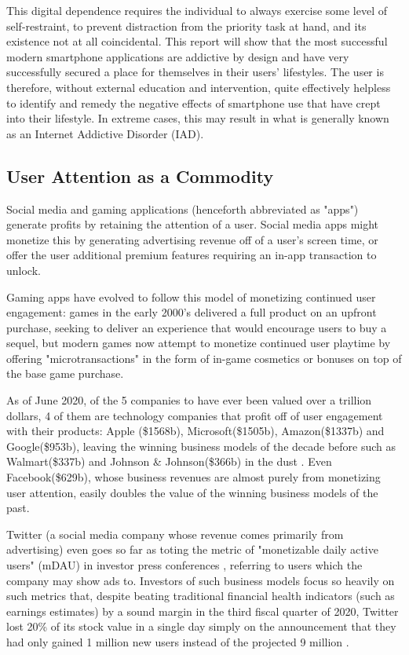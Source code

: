This digital dependence requires the individual to always exercise some level of self-restraint, to prevent distraction from the priority task at hand, and its existence not at all coincidental. This report will show that the most successful modern smartphone applications are addictive by design and have very successfully secured a place for themselves in their users' lifestyles. The user is therefore, without external education and intervention, quite effectively helpless to identify and remedy the negative effects of smartphone use that have crept into their lifestyle. In extreme cases, this may result in what is generally known as an Internet Addictive Disorder (IAD). 

\subsection{User Attention as a Commodity}
Social media and gaming applications (henceforth abbreviated as "apps") generate profits by retaining the attention of a user. Social media apps might monetize this by generating advertising revenue off of a user's screen time, or offer the user additional premium features requiring an in-app transaction to unlock.

Gaming apps have evolved to follow this model of monetizing continued user engagement: games in the early 2000's delivered a full product on an upfront purchase, seeking to deliver an experience that would encourage users to buy a sequel, but modern games now attempt to monetize continued user playtime by offering "microtransactions" in the form of in-game cosmetics or bonuses on top of the base game purchase.

As of June 2020, of the 5 companies to have ever been valued over a trillion dollars, 4 of them are technology companies that profit off of user engagement with their products: Apple (\$1568b), Microsoft(\$1505b), Amazon(\$1337b) and Google(\$953b), leaving the winning business models of the decade before such as Walmart(\$337b) and Johnson \& Johnson(\$366b) in the dust \cite{pwctop100}. Even Facebook(\$629b), whose business revenues are almost purely from monetizing user attention, easily doubles the value of the winning business models of the past.

Twitter (a social media company whose revenue comes primarily from advertising) even goes so far as toting the metric of "monetizable daily active users" (mDAU) in investor press conferences \cite{twtrTranscript}, referring to users which the company may show ads to. Investors of such business models focus so heavily on such metrics that, despite beating traditional financial health indicators (such as earnings estimates) by a sound margin in the third fiscal quarter of 2020, Twitter lost 20\% of its stock value in a single day simply on the announcement that they had only gained 1 million new users instead of the projected 9 million \cite{twtrLoss} \cite{twtrTranscript}.

